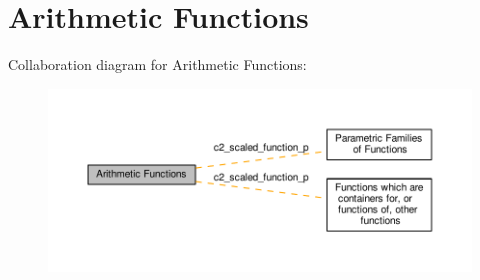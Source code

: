 \hypertarget{group__arithmetic__functions}{}\section{Arithmetic Functions}
\label{group__arithmetic__functions}
Collaboration diagram for Arithmetic Functions\+:
\nopagebreak
\begin{figure}[H]
\begin{center}
\leavevmode
\includegraphics[width=350pt]{group__arithmetic__functions}
\end{center}
\end{figure}
